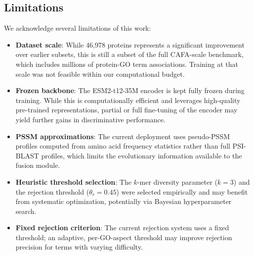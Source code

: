 \documentclass[conference]{IEEEtran}
\begin{document}
\subsection{Limitations}
We acknowledge several limitations of this work:
\begin{itemize}
    \item \textbf{Dataset scale}: While 46{,}978 proteins represents a significant improvement over earlier subsets, this is still a subset of the full CAFA-scale benchmark, which includes millions of protein-GO term associations. Training at that scale was not feasible within our computational budget.
    \item \textbf{Frozen backbone}: The ESM2-t12-35M encoder is kept fully frozen during training. While this is computationally efficient and leverages high-quality pre-trained representations, partial or full fine-tuning of the encoder may yield further gains in discriminative performance.
    \item \textbf{PSSM approximations}: The current deployment uses pseudo-PSSM profiles computed from amino acid frequency statistics rather than full PSI-BLAST profiles, which limits the evolutionary information available to the fusion module.
    \item \textbf{Heuristic threshold selection}: The $k$-mer diversity parameter ($k=3$) and the rejection threshold ($\theta_r = 0.45$) were selected empirically and may benefit from systematic optimization, potentially via Bayesian hyperparameter search.
    \item \textbf{Fixed rejection criterion}: The current rejection system uses a fixed threshold; an adaptive, per-GO-aspect threshold may improve rejection precision for terms with varying difficulty.
\end{itemize}
\end{document}
